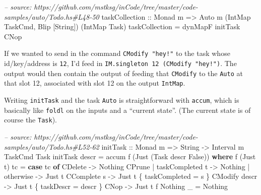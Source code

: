 \documentclass[]{article}
\newenvironment{Shaded}{\begin{snugshade}}{\end{snugshade}}
\newcommand{\CommentTok}[1]{\textcolor[rgb]{0.56,0.35,0.01}{\textit{#1}}}
\newcommand{\DataTypeTok}[1]{\textcolor[rgb]{0.13,0.29,0.53}{#1}}
\newcommand{\FunctionTok}[1]{\textcolor[rgb]{0.00,0.00,0.00}{#1}}
\newcommand{\KeywordTok}[1]{\textcolor[rgb]{0.13,0.29,0.53}{\textbf{#1}}}
\newcommand{\NormalTok}[1]{#1}
\newcommand{\OtherTok}[1]{\textcolor[rgb]{0.56,0.35,0.01}{#1}}
\begin{document}
\begin{Shaded}
\begin{Highlighting}[]
\CommentTok{-- source: https://github.com/mstksg/inCode/tree/master/code-samples/auto/Todo.hs#L48-50}
\OtherTok{taskCollection ::} \DataTypeTok{Monad}\NormalTok{ m}
               \OtherTok{=>} \DataTypeTok{Auto}\NormalTok{ m (}\DataTypeTok{IntMap} \DataTypeTok{TaskCmd}\NormalTok{, }\DataTypeTok{Blip}\NormalTok{ [}\DataTypeTok{String}\NormalTok{]) (}\DataTypeTok{IntMap} \DataTypeTok{Task}\NormalTok{)}
\NormalTok{taskCollection }\FunctionTok{=}\NormalTok{ dynMapF initTask }\DataTypeTok{CNop}
\end{Highlighting}
\end{Shaded}

If we wanted to send in the command \texttt{CModify\ "hey!"} to the task whose
id/key/address is \texttt{12}, I'd feed in
\texttt{IM.singleton\ 12\ (CModify\ "hey!")}. The output would then contain the
output of feeding that \texttt{CModify} to the \texttt{Auto} at that slot 12,
associated with slot 12 on the output \texttt{IntMap}.

Writing \texttt{initTask} and the task \texttt{Auto} is straightforward with
\texttt{accum}, which is basically like \texttt{foldl} on the inputs and a
``current state''. (The current state is of course the \texttt{Task}).

\begin{Shaded}
\begin{Highlighting}[]
\CommentTok{-- source: https://github.com/mstksg/inCode/tree/master/code-samples/auto/Todo.hs#L52-62}
\OtherTok{initTask ::} \DataTypeTok{Monad}\NormalTok{ m }\OtherTok{=>} \DataTypeTok{String} \OtherTok{->} \DataTypeTok{Interval}\NormalTok{ m }\DataTypeTok{TaskCmd} \DataTypeTok{Task}
\NormalTok{initTask descr }\FunctionTok{=}\NormalTok{ accum f (}\DataTypeTok{Just}\NormalTok{ (}\DataTypeTok{Task}\NormalTok{ descr }\DataTypeTok{False}\NormalTok{))}
  \KeywordTok{where}
\NormalTok{    f (}\DataTypeTok{Just}\NormalTok{ t) tc }\FunctionTok{=} \KeywordTok{case}\NormalTok{ tc }\KeywordTok{of}
                      \DataTypeTok{CDelete}                  \OtherTok{->} \DataTypeTok{Nothing}
                      \DataTypeTok{CPrune} \FunctionTok{|}\NormalTok{ taskCompleted t }\OtherTok{->} \DataTypeTok{Nothing}
                             \FunctionTok{|}\NormalTok{ otherwise       }\OtherTok{->} \DataTypeTok{Just}\NormalTok{ t}
                      \DataTypeTok{CComplete}\NormalTok{ s              }\OtherTok{->} \DataTypeTok{Just}\NormalTok{ t \{ taskCompleted }\FunctionTok{=}\NormalTok{ s \}}
                      \DataTypeTok{CModify}\NormalTok{ descr            }\OtherTok{->} \DataTypeTok{Just}\NormalTok{ t \{ taskDescr }\FunctionTok{=}\NormalTok{ descr \}}
                      \DataTypeTok{CNop}                     \OtherTok{->} \DataTypeTok{Just}\NormalTok{ t}
\NormalTok{    f }\DataTypeTok{Nothing}\NormalTok{ _   }\FunctionTok{=} \DataTypeTok{Nothing}
\end{Highlighting}
\end{Shaded}
\end{document}
